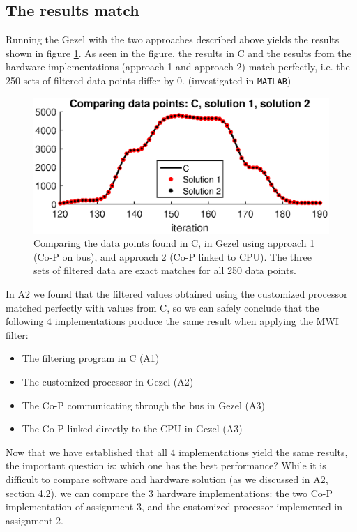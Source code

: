 \subsection{The results match} 
Running the Gezel with the two approaches described above yields the results shown in figure \ref{fig:Cd1d2}. As seen in the figure, the results in C and the results from the hardware implementations (approach 1 and approach 2) 
match perfectly, i.e. the 250 sets of filtered data points differ by 0. (investigated in \texttt{MATLAB})

\begin{figure}[H]
    \centering
    \includegraphics[width=1.0\textwidth]{3Results/fig/Cd1d2.eps}
    \caption{Comparing the data points found in C, in Gezel using approach 1 (Co-P on bus), and approach 2 (Co-P linked to CPU). The three sets of filtered data are exact matches for all 250 data points.}
    \label{fig:Cd1d2}
\end{figure}

In A2 we found that the filtered values obtained using the customized processor matched perfectly with values from C, so we can safely conclude that the following 4 implementations produce the same result when applying the MWI filter:

\begin{itemize}
    \item The filtering program in C (A1)
    \item The customized processor in Gezel (A2)
    \item The Co-P communicating through the bus in Gezel (A3)
    \item The Co-P linked directly to the CPU in Gezel (A3)
\end{itemize}

Now that we have established that all 4 implementations yield the same results, the important question is: which one has the best performance? While it is difficult to compare software and hardware solution (as we discussed in A2, section 4.2), we can compare the 3 hardware implementations: the two Co-P implementation of assignment 3, and the customized processor implemented in assignment 2.

